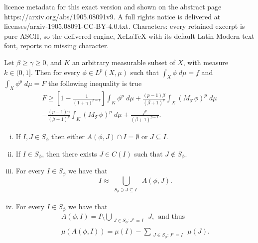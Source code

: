\documentclass[10pt,a4paper]{amsart}
\begin{document}
licence metadata for this exact version and shown on the abstract page https://arxiv.org/abs/1905.08091v9. A full rights notice is delivered at licenses/arxiv-1905.08091-CC-BY-4.0.txt. Characters: every retained excerpt is pure ASCII, so the delivered engine, XeLaTeX with its default Latin Modern text font, reports no missing character.
\begin{theorem}\label{thm:3p1}
Let $\beta\geq\gamma\geq 0$, and $K$ an arbitrary measurable subset of $X$, with measure $k\in (0,1]$. Then for every $\phi\in L^p(X,\mu)$ such that $\int_X \phi \; d\mu = f$ and $\int_X \phi^p \; d\mu = F$ the following inequality is true
\begin{multline} \label{eq:1p9}
F\geq \left[ 1-\frac{1}{(1+\gamma)^{p-1}} \right] \int_K \phi^p \; d\mu + \frac{(p-1)\beta}{(\beta+1)^p} \int_X (M_{\mathcal{T}}\phi)^p \; d\mu \\ - \frac{(p-1)\gamma}{(\beta+1)^p} \int_K (M_{\mathcal{T}}\phi)^p \; d\mu + \frac{f^p}{(\beta+1)^{p-1}}.
\end{multline}
\end{theorem}

\begin{lemma} \label{lem:3p1}
\begin{enumerate}[i)]
\item If $I, J\in S_\phi$ then either $A(\phi,J)\cap I = \emptyset$ or $J\subseteq I$.
\item If $I\in S_\phi$, then there exists $J\in C(I)$ such that $J\notin S_\phi$.
\item For every $I\in S_\phi$ we have that
\[
I \approx \underset{\substack{S_{\phi}\ni J \subseteq I\ \,}}{\bigcup} A(\phi,J).
\]
\item For every $I\in S_\phi$ we have that
\begin{gather*}
A(\phi,I) = I\setminus \underset{\substack{J\in S_\phi : J^\star = I\ }}{\bigcup} J,\ \ \text{and thus} \\
\mu(A(\phi,I)) = \mu(I) - \sum_{\substack{J\in S_\phi: J^\star=I\ }} \mu(J).
\end{gather*}
\end{enumerate}
\end{lemma}
\end{document}
